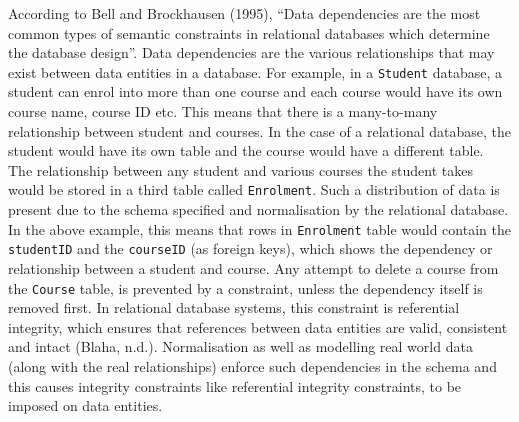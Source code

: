 According to Bell and Brockhausen (1995), ``Data dependencies are the most
common types of semantic constraints in relational databases which determine the
database design''. Data dependencies are the various relationships that may
exist between data entities in a database. For example, in a \texttt{Student}
database, a student can enrol into more than one course and each course would have its own
course name, course ID etc. This means that there is a many-to-many relationship
between student and courses. In the case of a relational database, the student
would have its own table and the course would have a different table. The
relationship between any student and various courses the student takes would be
stored in a third table called \texttt{Enrolment}. Such a distribution of data
is present due to the schema specified and normalisation by the relational
database. In the above example, this means that rows in \texttt{Enrolment} table
would contain the \texttt{studentID} and the \texttt{courseID} (as foreign
keys), which shows the dependency or relationship between a student and course.
Any attempt to delete a course from the \texttt{Course} table, is prevented by a
constraint, unless the dependency itself is removed first. In relational
database systems, this constraint is referential integrity, which ensures that references between data entities are valid, consistent and intact
(Blaha, n.d.). Normalisation as well as modelling real world data (along with
the real relationships) enforce such dependencies in the schema and this causes
integrity constraints like referential integrity constraints, to be imposed on
data entities.

